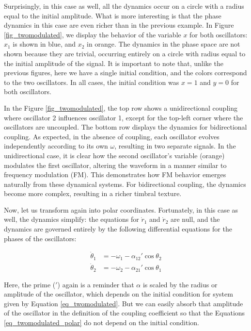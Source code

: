 \documentclass{article}
\begin{document}
Surprisingly, in this case as well, all the dynamics occur on a circle with a radius equal to the initial amplitude. 
What is more interesting is that the phase dynamics in this case are even richer than in the previous example. 
In Figure \ref{fig_twomodulated}, we display the behavior of the variable $x$ for both oscillators: $x_1$ is shown in blue, and $x_2$ in orange. 
The dynamics in the phase space are not shown because they are trivial, occurring entirely on a circle with 
radius equal to the initial amplitude of the signal. 
It is important to note that, unlike the previous figures, here we have a single initial condition, and the colors correspond to the two oscillators. 
In all cases, the initial condition was $x = 1$ and $y = 0$ for both oscillators.

In the Figure \ref{fig_twomodulated}, the top row shows a unidirectional coupling where oscillator 2 influences oscillator 1, except for the top-left corner where the oscillators are uncoupled. 
The bottom row displays the dynamics for bidirectional coupling. 
As expected, in the absence of coupling, each oscillator evolves independently according to its own $\omega$, resulting in two separate signals. 
In the unidirectional case, it is clear how the second oscillator's variable (orange) modulates the first oscillator, altering the waveform in a manner similar to frequency modulation (FM). 
This demonstrates how FM behavior emerges naturally from these dynamical systems. 
For bidirectional coupling, the dynamics become more complex, resulting in a richer timbral texture.

Now, let us transform again into polar coordinates. 
Fortunately, in this case as well, the dynamics simplify: the equations for $\dot{r}_1$ and $\dot{r}_2$ are null, and the dynamics are governed entirely by the following differential equations for the phases of the oscillators:

\begin{subequations}  \label{eq_twomodulated_polar}
\begin{align}
    \dot{\theta}_1 & = -\omega_1  - \alpha_{12}' \cos{\theta}_2 \\
    \dot{\theta}_2 & = -\omega_2  - \alpha_{21}' \cos{\theta}_1
\end{align}
\end{subequations}

Here, the prime ($'$) again is a reminder that $\alpha$ is scaled by the radius or amplitude of the oscillator, which depends on the initial condition for system given by Equation \ref{eq_twomodulated}. 
But we can easily absorb that amplitude of the oscillator in the definition of the coupling coefficient so that the Equations \ref{eq_twomodulated_polar} do not depend on the initial condition.
\end{document}
